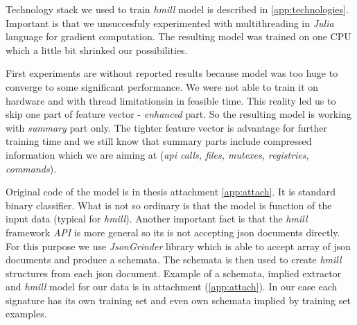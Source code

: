 
Technology stack we used to train \emph{hmill} model is described in \ref{app:technologies}. Important is that we unsuccesfuly experimented with multithreading in \emph{Julia} language for gradient computation. The resulting model was trained on one CPU which a little bit shrinked our possibilities.

First experiments are without reported results because model was too huge to converge to some significant performance. We were not able to train it on hardware and with thread limitationsin in feasible time. This reality led us to skip one part of feature vector - \emph{enhanced} part. So the resulting model is working with \emph{summary} part only. The tighter feature vector is advantage for further training time and we still know that summary parts include compressed information which we are aiming at (\emph{api calls, files, mutexes, registries, commands}).

Original code of the model is in thesis attachment \ref{app:attach}. It is standard binary classifier. What is not so ordinary is that the model is function of the input data (typical for \emph{hmill}). Another important fact is that the \emph{hmill} framework \emph{API} is more general so its is not accepting json documents directly. For this purpose we use \emph{JsonGrinder} library which is able to accept array of json documents and produce a schemata. The schemata is then used to create \emph{hmill} structures from each json document. Example of a schemata, implied extractor and \emph{hmill} model for our data is in attachment (\ref{app:attach}). In our case each signature has its own training set and even own schemata implied by training set examples.



